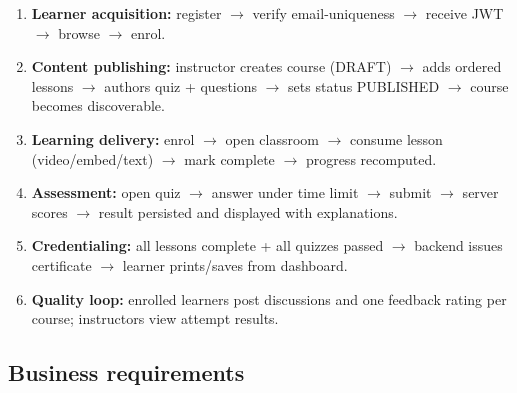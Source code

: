 \begin{enumerate}
    \item \textbf{Learner acquisition:} register $\rightarrow$ verify email-uniqueness $\rightarrow$ receive JWT $\rightarrow$ browse $\rightarrow$ enrol.
    \item \textbf{Content publishing:} instructor creates course (DRAFT) $\rightarrow$ adds ordered lessons $\rightarrow$ authors quiz + questions $\rightarrow$ sets status PUBLISHED $\rightarrow$ course becomes discoverable.
    \item \textbf{Learning delivery:} enrol $\rightarrow$ open classroom $\rightarrow$ consume lesson (video/embed/text) $\rightarrow$ mark complete $\rightarrow$ progress recomputed.
    \item \textbf{Assessment:} open quiz $\rightarrow$ answer under time limit $\rightarrow$ submit $\rightarrow$ server scores $\rightarrow$ result persisted and displayed with explanations.
    \item \textbf{Credentialing:} all lessons complete + all quizzes passed $\rightarrow$ backend issues certificate $\rightarrow$ learner prints/saves from dashboard.
    \item \textbf{Quality loop:} enrolled learners post discussions and one feedback rating per course; instructors view attempt results.
\end{enumerate}

\subsection{Business requirements}

